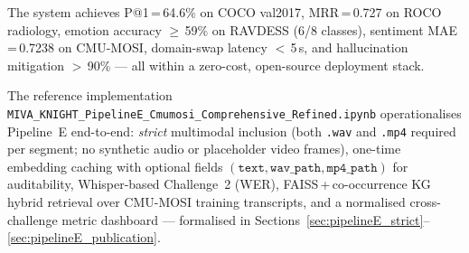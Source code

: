 \documentclass[12pt,a4paper]{article}
\theoremstyle{definition}
\theoremstyle{plain}
\theoremstyle{remark}
\begin{document}
The system achieves P@1\,=\,64.6\% on COCO val2017, MRR\,=\,0.727 on ROCO radiology, emotion accuracy $\geq$\,59\% on RAVDESS (6/8 classes), sentiment MAE\,=\,0.7238 on CMU-MOSI, domain-swap latency $<$\,5\,s, and hallucination mitigation $>$\,90\% --- all within a zero-cost, open-source deployment stack.

The reference implementation \texttt{MIVA\_KNIGHT\_PipelineE\_Cmumosi\_Comprehensive\_Refined.ipynb} operationalises Pipeline~E end-to-end: \emph{strict} multimodal inclusion (both \texttt{.wav} and \texttt{.mp4} required per segment; no synthetic audio or placeholder video frames), one-time embedding caching with optional fields $(\texttt{text}, \texttt{wav\_path}, \texttt{mp4\_path})$ for auditability, Whisper-based Challenge~2 (WER), FAISS\,+\,co-occurrence KG hybrid retrieval over CMU-MOSI training transcripts, and a normalised cross-challenge metric dashboard --- formalised in Sections~\ref{sec:pipelineE_strict}--\ref{sec:pipelineE_publication}.
\end{document}
